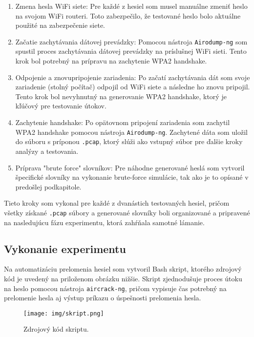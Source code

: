 \documentclass[12pt, twoside]{book}
\begin{document}
\begin{enumerate} 
\item Zmena hesla WiFi siete: Pre každé z hesiel som musel manuálne zmeniť heslo na svojom WiFi routeri. Toto zabezpečilo, že testované heslo bolo aktuálne použité na zabezpečenie siete.

\item Začatie zachytávania dátovej prevádzky: Pomocou nástroja \texttt{Airodump-ng} som spustil proces zachytávania dátovej prevádzky na príslušnej WiFi sieti. Tento krok bol potrebný na prípravu na zachytenie WPA2 handshake.

\item Odpojenie a znovupripojenie zariadenia: Po začatí zachytávania dát som svoje zariadenie (stolný počítač) odpojil od WiFi siete a následne ho znovu pripojil. Tento krok bol nevyhnutný na generovanie WPA2 handshake, ktorý je kľúčový pre testovanie útokov.

\item Zachytenie handshake: Po opätovnom pripojení zariadenia som zachytil WPA2 handshake pomocou nástroja \texttt{Airodump-ng}. Zachytené dáta som uložil do súboru s príponou \texttt{.pcap}, ktorý slúži ako vstupný súbor pre ďalšie kroky analýzy a testovania.

\item Príprava "brute force" slovníkov: Pre náhodne generované heslá som vytvoril špecifické slovníky na vykonanie brute-force simulácie, tak ako je to opísané v predošlej podkapitole.
\end{enumerate}

Tieto kroky som vykonal pre každé z dvanástich testovaných hesiel, pričom všetky získané \texttt{.pcap} súbory a generované slovníky boli organizované a pripravené na nasledujúcu fázu experimentu, ktorá zahŕňala samotné lámanie.

\subsection{Vykonanie experimentu}
Na automatizáciu prelomenia hesiel som vytvoril Bash skript, ktorého zdrojový kód je uvedený na priloženom obrázku nižšie. Skript zjednodušuje proces útoku na heslo pomocou nástroja \texttt{aircrack-ng}, pričom vypisuje čas potrebný na prelomenie hesla aj výstup príkazu o úspešnosti prelomenia hesla.

\begin{figure}[H] 
    \centering
    \texttt{[image: img/skript.png]}
    \caption{Zdrojový kód skriptu.}
    \label{fig:skript}
\end{figure}
\end{document}
